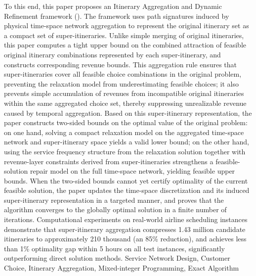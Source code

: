 {To this end, this paper proposes an Itinerary Aggregation and Dynamic Refinement framework (\algoNotation). The framework uses path signatures induced by physical time-space network aggregation to represent the original itinerary set as a compact set of super-itineraries. Unlike simple merging of original itineraries, this paper computes a tight upper bound on the combined attraction of feasible original itinerary combinations represented by each super-itinerary, and constructs corresponding revenue bounds. This aggregation rule ensures that super-itineraries cover all feasible choice combinations in the original problem, preventing the relaxation model from underestimating feasible choices; it also prevents simple accumulation of revenues from incompatible original itineraries within the same aggregated choice set, thereby suppressing unrealizable revenue caused by temporal aggregation. Based on this super-itinerary representation, the paper constructs two-sided bounds on the optimal value of the original problem: on one hand, solving a compact relaxation model on the aggregated time-space network and super-itinerary space yields a valid lower bound; on the other hand, using the service frequency structure from the relaxation solution together with revenue-layer constraints derived from super-itineraries strengthens a feasible-solution repair model on the full time-space network, yielding feasible upper bounds. When the two-sided bounds cannot yet certify optimality of the current feasible solution, the paper updates the time-space discretization and its induced super-itinerary representation in a targeted manner, and proves that the algorithm converges to the globally optimal solution in a finite number of iterations. Computational experiments on real-world airline scheduling instances demonstrate that super-itinerary aggregation compresses 1.43 million candidate itineraries to approximately 210 thousand (an 85\% reduction), and \algoNotation\xspace achieves less than 1\% optimality gap within 5 hours on all test instances, significantly outperforming direct solution methods.
}{Service Network Design, Customer Choice, Itinerary Aggregation, Mixed-integer Programming, Exact Algorithm}
